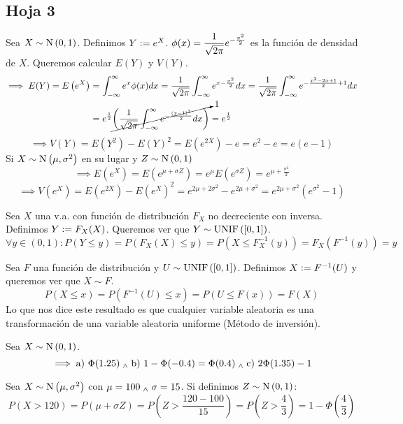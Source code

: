 \subsection{Hoja 3}

 Sea $X\sim\operatorname{N}\left(0,1\right)$. Definimos $Y\vcentcolon= e^X$. $\displaystyle\phi(x) = \frac{1}{\sqrt{2\pi}}e^{-\frac{x^2}{2}}$ es la función de densidad de $X$. Queremos calcular $E(Y)$ y $V(Y)$.
\[\begin{aligned}
		\implies E(Y) = E\left(e^X\right) & = \int_{-\infty}^{\infty} e^x\phi(x)dx = \frac{1}{\sqrt{2\pi}} \int_{-\infty}^{\infty} e^{x-\frac{x^2}{2}}dx = \frac{1}{\sqrt{2\pi}}\int_{-\infty}^{\infty} e^{-\frac{x^2-2x+1}{2}+1}dx \\
		                                  & = e^{\frac{1}{2}} \cancelto{1}{\left(\frac{1}{\sqrt{2\pi}} \int_{-\infty}^{\infty} e^{-\frac{(x-1)^2}{2}}dx \right)} = e^{\frac{1}{2}}
	\end{aligned}\]
\[\implies V(Y) = E(Y^2) - E(Y)^2 = E(e^{2X}) - e = e^2 - e = e(e-1)\]
Si $X\sim\operatorname{N}\left(\mu, \sigma^2\right)$ en su lugar y $Z\sim\operatorname{N}\left(0,1\right)$
\[\implies E(e^X) = E\left(e^{\mu+\sigma Z} \right) = e^{\mu}E\left(e^{\sigma Z}\right) = e^{\mu+\frac{\sigma^2}{2}}\]
\[\implies V\left(e^X\right) = E\left(e^{2X}\right) - E\left(e^X\right)^2 = e^{2\mu + 2\sigma^2} - e^{2\mu + \sigma^2} = e^{2\mu + \sigma^2}\left(e^{\sigma^2} - 1\right)\]

 Sea $X$ una v.a. con función de distribución $F_X$ no decreciente con inversa. Definimos $Y \vcentcolon= F_X(X)$. Queremos ver que $Y\sim\operatorname{UNIF}\left([0,1]\right)$.
\[\forall y \in (0, 1) : P(Y \leq y) = P(F_X(X) \leq y) = P(X \leq F_X^{-1} (y)) = F_X(F^{-1} (y)) = y\]

 Sea $F$ una función de distribución y $U\sim\operatorname{UNIF}\left([0, 1]\right)$. Definimos $X \vcentcolon= F^{-1}(U)$ y queremos ver que $X\sim F$.
\[P(X \leq x) = P(F^{-1}(U) \leq x) = P(U \leq F(x)) = F(X)\]
Lo que nos dice este resultado es que cualquier variable aleatoria es una transformación de una variable aleatoria uniforme (Método de inversión).

 Sea $X\sim\operatorname{N}\left(0,1\right)$.
\[\implies \text{a) }\Phi(1.25) \; _{\wedge} \; \text{b) }1-\Phi(-0.4) = \Phi(0.4) \; _{\wedge} \; \text{c) } 2\Phi(1.35) - 1\]

 Sea $X\sim\operatorname{N}\left(\mu, \sigma^2\right)$ con $\mu = 100 \; _{\wedge} \; \sigma = 15$. Si definimos $Z\sim\operatorname{N}\left(0,1\right)$:
\[P(X > 120) = P\left(\mu + \sigma Z\right) = P\left(Z > \frac{120-100}{15}\right) = P\left(Z > \frac{4}{3}\right) = 1 - \Phi\left(\frac{4}{3}\right)\]

